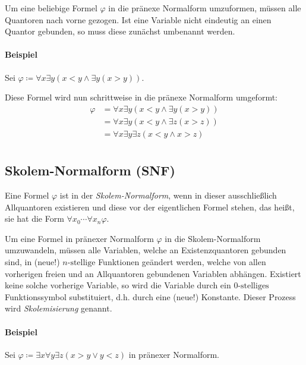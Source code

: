             Um eine beliebige Formel $ \varphi $ in die pränexe Normalform umzuformen, müssen alle Quantoren nach vorne gezogen. Ist eine Variable nicht eindeutig an einen Quantor gebunden, so muss diese zunächst umbenannt werden.

            \paragraph{Beispiel}
                Sei $ \varphi \coloneqq \forall x \exists y (x < y \land \exists y (x > y)) $.

                Diese Formel wird nun schrittweise in die pränexe Normalform umgeformt:
                \begin{align*}
                    \varphi &= \forall x \exists y (x < y \land \exists y (x > y)) \tag{Umbenennung} \\
                            &= \forall x \exists y (x < y \land \exists z (x > z)) \tag{Quantoren-Verschiebung} \\
                            &= \forall x \exists y \exists z (x < y \land x > z) \tag{Pränexe Normalform} \\
                \end{align*}

        \subsection{Skolem-Normalform (SNF)}
            Eine Formel $ \varphi $ ist in der \textit{Skolem-Normalform}, wenn in dieser ausschließlich Allquantoren existieren und diese vor der eigentlichen Formel stehen, das heißt, sie hat die Form $ \forall x _ 0 \cdots \forall x _ n \varphi $.

            Um eine Formel in pränexer Normalform $ \varphi $ in die Skolem-Normalform umzuwandeln, müssen alle Variablen, welche an Existenzquantoren gebunden sind, in (neue!) $ n\text{-stellige} $ Funktionen geändert werden, welche von allen vorherigen freien und an Allquantoren gebundenen Variablen abhängen. Existiert keine solche vorherige Variable, so wird die Variable durch ein $ 0\text{-stelliges} $ Funktionssymbol substituiert, d.h. durch eine (neue!) Konstante. Dieser Prozess wird \textit{Skolemisierung} genannt.

            \paragraph{Beispiel}
                Sei $ \varphi \coloneqq \exists x \forall y \exists z (x > y \lor y < z) $ in pränexer Normalform.

